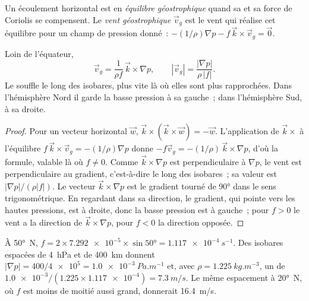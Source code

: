 \begin{definition}\label{def:b1:atmospheric-circulation:geostrophic}
Un écoulement horizontal est en \emph{équilibre géostrophique} quand
sa  et sa force de Coriolis se compensent. Le \emph{vent
géostrophique} $\vec v_g$ est le vent qui réalise cet équilibre pour un
champ de pression donné~: $-(1/\rho)\nabla p - f\,\vec k\times\vec v_g = \vec 0$.
\end{definition}

\begin{theorem}\label{thm:b1:atmospheric-circulation:geostrophic}
Loin de l'équateur,
\[
  \vec v_g = \frac{1}{\rho f}\,\vec k\times\nabla p, \qquad
  |\vec v_g| = \frac{|\nabla p|}{\rho\,|f|} .
\]
Le  souffle le long des isobares, plus vite là où elles sont plus rapprochées.
Dans l'hémisphère Nord il garde la basse pression à sa gauche~; dans l'hémisphère
Sud, à sa droite.
\end{theorem}

\begin{proof}
Pour un vecteur horizontal $\vec w$, $\vec k\times(\vec k\times\vec w) = -\vec w$.
L'application de $\vec k\times$ à l'équilibre $f\,\vec k\times\vec v_g = -(1/\rho)\nabla p$
donne $-f\vec v_g = -(1/\rho)\,\vec k\times\nabla p$, d'où la formule, valable là où
$f \neq 0$. Comme $\vec k\times\nabla p$ est perpendiculaire à $\nabla p$, le vent est
perpendiculaire au gradient, c'est-à-dire le long des isobares~; sa valeur est $|\nabla
p|/(\rho|f|)$. Le vecteur $\vec k\times\nabla p$ est le gradient tourné de \ang{90}
dans le sens trigonométrique. En regardant dans sa direction, le gradient, qui pointe vers les hautes pressions,
est à droite, donc la basse pression est à gauche~; pour $f > 0$ le vent a
la direction de $\vec k\times\nabla p$, pour $f < 0$ la direction opposée.
\end{proof}

\begin{example}\label{ex:b1:atmospheric-circulation:geostrophic}
À \ang{50}~N, $f = 2 \times \num{7.292e-5} \times \sin\ang{50} = \qty{1.117e-4}{s^{-1}}$.
Des isobares espacées de \qty{4}{hPa} et de \qty{400}{km} donnent $|\nabla p| = 400/\num{4e5} =
\qty{1.0e-3}{Pa.m^{-1}}$ et, avec $\rho = \qty{1.225}{kg.m^{-3}}$, un  de $\num{1.0e-3}/(1.225 \times \num{1.117e-4}) = \qty{7.3}{m/s}$. Le même
espacement à \ang{20}~N, où $f$ est moins de moitié aussi grand, donnerait
\qty{16.4}{m/s}.
\end{example}

